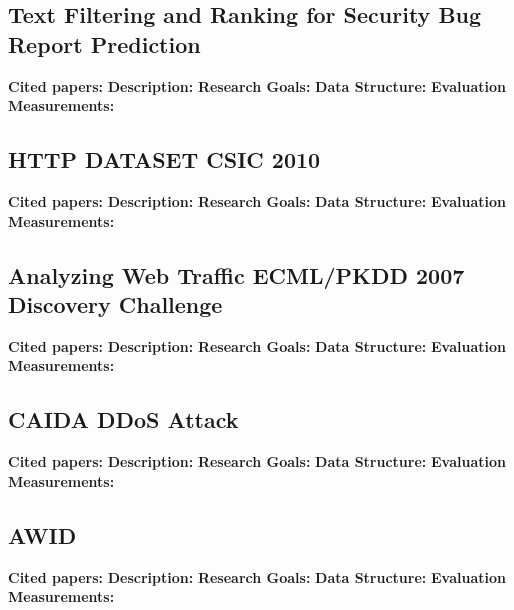 \subsection{Text Filtering and Ranking for Security Bug Report Prediction}
\textbf{Cited papers:} \newline
\textbf{Description:} \newline
\textbf{Research Goals:}  \newline
\textbf{Data Structure:} \newline
\textbf{Evaluation Measurements:} \newline


\subsection{HTTP DATASET CSIC 2010}
\textbf{Cited papers:} \newline
\textbf{Description:} \newline
\textbf{Research Goals:}  \newline
\textbf{Data Structure:} \newline
\textbf{Evaluation Measurements:} \newline

\subsection{Analyzing Web Traffic ECML/PKDD 2007 Discovery Challenge}
\textbf{Cited papers:} \newline
\textbf{Description:} \newline
\textbf{Research Goals:}  \newline
\textbf{Data Structure:} \newline
\textbf{Evaluation Measurements:} \newline

\subsection{CAIDA DDoS Attack}
\textbf{Cited papers:} \newline
\textbf{Description:} \newline
\textbf{Research Goals:}  \newline
\textbf{Data Structure:} \newline
\textbf{Evaluation Measurements:} \newline


\subsection{AWID}
\textbf{Cited papers:} \newline
\textbf{Description:} \newline
\textbf{Research Goals:}  \newline
\textbf{Data Structure:} \newline
\textbf{Evaluation Measurements:} \newline

